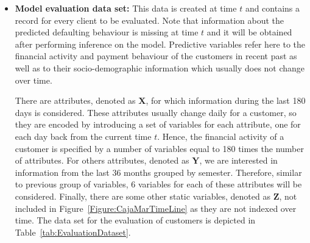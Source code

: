 \documentclass{article}
\theoremstyle{theorem}
\theoremstyle{definition}
\newcommand{\X}{\mathbf{X}}
\newcommand{\Y}{\mathbf{Y}}
\newcommand{\Z}{\mathbf{Z}}
\begin{document}
\begin{itemize}

\item \textbf{Model evaluation data set:} This data is created at time $t$ and contains a record for every client to be evaluated. Note that information about the predicted defaulting behaviour is missing at time $t$ and it will be obtained after performing inference on the model. Predictive variables refer here to the financial activity and payment behaviour of the customers in recent past as well as to their socio-demographic information which usually does not change over time. 

There are attributes, denoted as $\X$, for which information during the last 180 days is considered. 
These attributes usually change daily for a customer, so they are encoded by introducing a set of variables for each attribute, one for each day back from the current time $t$. Hence, the financial activity of a customer is specified by a number of variables equal to 180 times the number of attributes. For others attributes, denoted as $\Y$, we are interested in information from the last $36$ months grouped by semester. 
Therefore, similar to previous group of variables, $6$ variables for each of these attributes will be considered. Finally, there are some other static variables, denoted as $\Z$, not included in Figure~\ref{Figure:CajaMarTimeLine} as they are not indexed over time. The data set for the evaluation of customers is depicted in Table~\ref{tab:EvaluationDataset}. 





\end{itemize}
\end{document}
